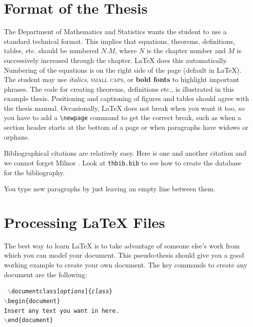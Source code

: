\section{Format of the Thesis}
The Department of Mathematics and Statistics wants the student to use
a standard technical format. This implies that equations, theorems,
definitions, tables, etc. should be numbered $N.M$, where $N$ is the
chapter number and $M$ is successively increased through the chapter.
\LaTeX{} does this automatically. Numbering of the equations is on the
right side of the page (default in \LaTeX).  The student may use
\textit{italics}, \textsc{small caps}, or \textbf{bold fonts} to
highlight important phrases.  The code for creating theorems,
definitions etc., is illustrated in this example thesis.  Positioning
and captioning of figures and tables should agree with the thesis
manual.  Occasionally, \LaTeX{} does not break when you want it too, so
you have to add a \verb+\newpage+ command to get the correct break,
such as when a section header starts at the bottom of a page or when
paragraphs have widows or orphans.

Bibliographical citations are relatively easy.  Here is one \cite{ART}
and another citation \cite{Lehto:1976} and we cannot forget Milnor
\cite{Milnor:topdiff}.  Look at \verb+thbib.bib+ to see how to create
the database for the bibliography.

You type new paragraphs by just leaving an empty line between them.



\section{Processing \LaTeX{} Files}

The best way to learn \LaTeX{} is to take advantage of someone else's
work from which you can model your document. This pseudo-thesis should
give you a good working example to create your own document. The key
commands to create any document are the following: \vspace{.15in}

\noindent\texttt{%
  \ssp %
  \hspace*{5em}$\backslash$documentclass[\emph{options}]\{\emph{class}\}\\
  \hspace*{5em}$\backslash$begin\{document\}\\
  \hspace*{7em}Insert any text you want in here.\\
  \hspace*{5em}$\backslash$end\{document\}\\
}

